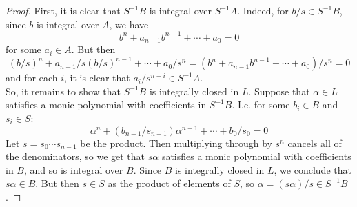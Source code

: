 \begin{proof}
	First, it is clear that $S^{-1}B$ is integral over $S^{-1}A$. Indeed, for $b/s \in S^{-1}B$, since $b$ is integral over $A$, we have
	\[ b^n + a_{n-1}b^{n-1} + \cdots + a_0 = 0 \]
	for some $a_i \in A$. But then
	\[ (b/s)^n + a_{n-1}/s(b/s)^{n-1} + \cdots + a_0/s^n = (b^n+a_{n-1}b^{n-1}+\cdots+a_0)/s^n = 0 \]
	and for each $i$, it is clear that $a_i/s^{n-i} \in S^{-1}A$. \\
	
	So, it remains to show that $S^{-1}B$ is integrally closed in $L$. Suppose that $\alpha \in L$ satisfies a monic polynomial with coefficients in $S^{-1}B$. I.e. for some $b_i \in B$ and $s_i \in S$:
	\[ \alpha^n + (b_{n-1}/s_{n-1})\alpha^{n-1} + \cdots + b_0/s_0 = 0 \]
	Let $s = s_0 \cdots s_{n-1}$ be the product. Then multiplying through by $s^n$ cancels all of the denominators, so we get that $s\alpha$ satisfies a monic polynomial with coefficients in $B$, and so is integral over $B$. Since $B$ is integrally closed in $L$, we conclude that $s\alpha \in B$. But then $s \in S$ as the product of elements of $S$, so $\alpha = (s\alpha)/s \in S^{-1}B$.
\end{proof}
